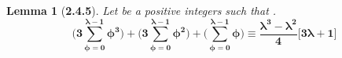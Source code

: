 \documentclass[a4paper, 12pt]{article}
\theoremstyle{plain}
\newtheorem*{lemma*}{Lemma}
\begin{document}
\begin{lemma*}[\textbf{2.4.5}]
    Let \bm{$\iota$} be a positive integers such that
    \bm{$\big \lfloor \sqrt[3] \iota \big \rfloor = \lambda$}.
    \begin{equation*}
        \bm{
            \Bigg(
                3 \sum_{\phi=0}^{\lambda - 1} \phi ^3
            \Bigg)
                +
            \Bigg(
                3 \sum_{\phi=0}^{\lambda - 1} \phi ^2
            \Bigg)
                +
            \Bigg(
                \sum_{\phi=0}^{\lambda - 1} \phi
            \Bigg)
                \equiv
            \frac{
                \lambda ^3 - \lambda ^2
            }
            {4}
            \Bigg[ 3 \lambda + 1 \Bigg]
        }
    \end{equation*}
\end{lemma*}
\end{document}
